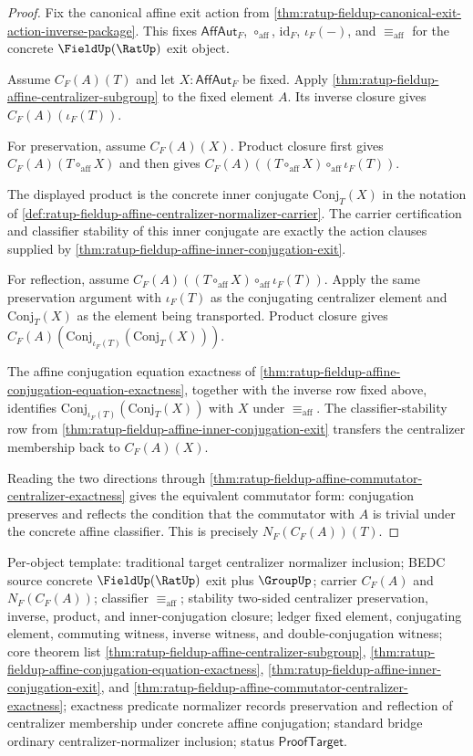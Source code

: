 \begin{proof}
Fix the canonical affine exit action from
\autoref{thm:ratup-fieldup-canonical-exit-action-inverse-package}. This fixes
$\mathsf{AffAut}_F$, $\circ_{\mathrm{aff}}$, $\mathrm{id}_F$, $\iota_F(-)$,
and $\equiv_{\mathrm{aff}}$ for the concrete $\FieldUp(\RatUp)$ exit object.

Assume $C_F(A)(T)$ and let $X:\mathsf{AffAut}_F$ be fixed. Apply
\autoref{thm:ratup-fieldup-affine-centralizer-subgroup} to the fixed element
$A$. Its inverse closure gives $C_F(A)(\iota_F(T))$.

For preservation, assume $C_F(A)(X)$. Product closure first gives
$C_F(A)(T\circ_{\mathrm{aff}}X)$ and then gives
$C_F(A)((T\circ_{\mathrm{aff}}X)\circ_{\mathrm{aff}}\iota_F(T))$.

The displayed product is the concrete inner conjugate
$\mathrm{Conj}_T(X)$ in the notation of
\autoref{def:ratup-fieldup-affine-centralizer-normalizer-carrier}. The carrier
certification and classifier stability of this inner conjugate are exactly the
action clauses supplied by
\autoref{thm:ratup-fieldup-affine-inner-conjugation-exit}.

For reflection, assume
$C_F(A)((T\circ_{\mathrm{aff}}X)\circ_{\mathrm{aff}}\iota_F(T))$. Apply the
same preservation argument with $\iota_F(T)$ as the conjugating centralizer
element and $\mathrm{Conj}_T(X)$ as the element being transported. Product
closure gives
$C_F(A)(\mathrm{Conj}_{\iota_F(T)}(\mathrm{Conj}_T(X)))$.

The affine conjugation equation exactness of
\autoref{thm:ratup-fieldup-affine-conjugation-equation-exactness}, together
with the inverse row fixed above, identifies
$\mathrm{Conj}_{\iota_F(T)}(\mathrm{Conj}_T(X))$ with $X$ under
$\equiv_{\mathrm{aff}}$. The classifier-stability row from
\autoref{thm:ratup-fieldup-affine-inner-conjugation-exit} transfers the
centralizer membership back to $C_F(A)(X)$.

Reading the two directions through
\autoref{thm:ratup-fieldup-affine-commutator-centralizer-exactness} gives the
equivalent commutator form: conjugation preserves and reflects the condition
that the commutator with $A$ is trivial under the concrete affine classifier.
This is
precisely $N_F(C_F(A))(T)$.
\end{proof}

Per-object template: traditional target centralizer normalizer inclusion; BEDC
source concrete $\FieldUp(\RatUp)$ exit plus $\GroupUp$; carrier $C_F(A)$ and
$N_F(C_F(A))$; classifier $\equiv_{\mathrm{aff}}$; stability two-sided
centralizer preservation, inverse, product, and inner-conjugation closure;
ledger fixed element, conjugating element, commuting witness, inverse witness,
and double-conjugation witness; core theorem list
\autoref{thm:ratup-fieldup-affine-centralizer-subgroup},
\autoref{thm:ratup-fieldup-affine-conjugation-equation-exactness},
\autoref{thm:ratup-fieldup-affine-inner-conjugation-exit}, and
\autoref{thm:ratup-fieldup-affine-commutator-centralizer-exactness}; exactness
predicate normalizer records preservation and reflection of centralizer
membership under concrete affine conjugation; standard bridge ordinary
centralizer-normalizer inclusion; status $\mathsf{ProofTarget}$.
